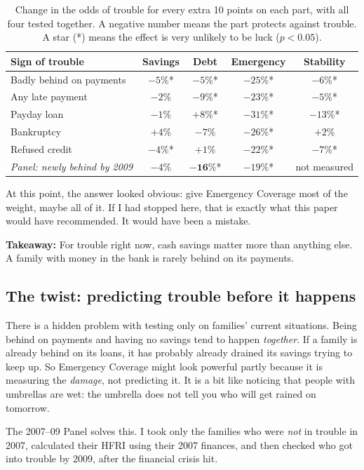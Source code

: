 \documentclass[11pt,a4paper]{article}
\newcommand{\takeaway}[1]{\par\smallskip\noindent\textbf{Takeaway:} #1\par\smallskip}
\newcommand{\pct}{\%}
\begin{document}
\begin{table}[H]
\centering\small
\caption{Change in the odds of trouble for every extra 10 points on each part, with all four tested together. A
negative number means the part protects against trouble. A star (*) means the effect is very unlikely to be luck
($p<0.05$).}
\label{tab:dims}
\begin{tabular}{lcccc}
\toprule
Sign of trouble & Savings & Debt & Emergency & Stability\\
\midrule
Badly behind on payments & $-5\pct$* & $-5\pct$* & $-25\pct$* & $-6\pct$*\\
Any late payment & $-2\pct$ & $-9\pct$* & $-23\pct$* & $-5\pct$*\\
Payday loan & $-1\pct$ & $+8\pct$* & $-31\pct$* & $-13\pct$*\\
Bankruptcy & $+4\pct$ & $-7\pct$ & $-26\pct$* & $+2\pct$\\
Refused credit & $-4\pct$* & $+1\pct$ & $-22\pct$* & $-7\pct$*\\
\midrule
\emph{Panel: newly behind by 2009} & $-4\pct$ & $\mathbf{-16\pct}$* & $-19\pct$* & not measured\\
\bottomrule
\end{tabular}
\end{table}

At this point, the answer looked obvious: give Emergency Coverage most of the weight, maybe all of it. If I had stopped
here, that is exactly what this paper would have recommended. It would have been a mistake.

\takeaway{For trouble right now, cash savings matter more than anything else. A family with money in the bank is rarely
behind on its payments.}

\subsection{The twist: predicting trouble before it happens}
There is a hidden problem with testing only on families' current situations. Being behind on payments and having no
savings tend to happen \emph{together}. If a family is already behind on its loans, it has probably already drained its
savings trying to keep up. So Emergency Coverage might look powerful partly because it is measuring the \emph{damage},
not predicting it. It is a bit like noticing that people with umbrellas are wet: the umbrella does not tell you who will
get rained on tomorrow.

The 2007--09 Panel solves this. I took only the families who were \emph{not} in trouble in 2007, calculated their HFRI
using their 2007 finances, and then checked who got into trouble by 2009, after the financial crisis hit.
\end{document}
